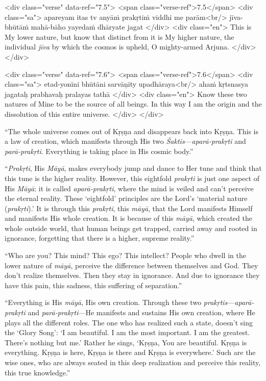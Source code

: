 \begin{html}
<div class="verse" data-ref="7.5">
  <span class="verse-ref">7.5</span>
  <div class="sa">
    apareyam itas tv anyāṁ prakṛtiṁ viddhi me parām<br/>
    jīva-bhūtāṁ mahā-bāho yayedaṁ dhāryate jagat
  </div>
  <div class="en">
    This is My lower nature, but know that distinct from it is My higher nature, the individual \textit{jīva} by which the cosmos is upheld, O mighty-armed Arjuna.
  </div>
</div>
\end{html}



\begin{html}
<div class="verse" data-ref="7.6">
  <span class="verse-ref">7.6</span>
  <div class="sa">
    etad-yonīni bhūtāni sarvāṇīty upadhāraya<br/>
    ahaṁ kṛtsnasya jagataḥ prabhavaḥ pralayas tathā
  </div>
  <div class="en">
    Know these two natures of Mine to be the source of all beings. In this way I am the origin and the dissolution of this entire universe.
  </div>
</div>
\end{html}


\enquote{The whole universe comes out of Kṛṣṇa and disappears back into Kṛṣṇa. This is a law of creation, which manifests through His two \textit{Śaktis}---\textit{aparā-prakṛti} and \textit{parā-prakṛti}. Everything is taking place in His cosmic body.}

\enquote{\textit{Prakṛti}, His \textit{Māyā}, makes everybody jump and dance to Her tune and think that this tune is the higher reality. However, this eightfold \textit{prakṛti} is just one aspect of His \textit{Māyā}: it is called \textit{aparā-prakṛti}, where the mind is veiled and can’t perceive the eternal reality. These \enquote{eightfold} principles are the Lord’s \enquote{material nature (\textit{prakṛti}).} It is through this \textit{prakṛti}, this \textit{māyā}, that the Lord manifests Himself and manifests His whole creation. It is because of this \textit{māyā}, which created the whole outside world, that human beings get trapped, carried away and rooted in ignorance, forgetting that there is a higher, supreme reality.}

\enquote{Who are you? This mind? This ego? This intellect? People who dwell in the lower nature of \textit{māyā}, perceive the difference between themselves and God. They don’t realize themselves. Then they stay in ignorance. And due to ignorance they have this pain, this sadness, this suffering of separation.}

\enquote{Everything is His \textit{māyā}, His own creation. Through these two \textit{prakṛtis}---\textit{aparā-prakṛti} and \textit{parā-prakṛti}---He manifests and sustains His own creation, where He plays all the different roles. The one who has realized such a state, doesn’t sing the \enquote{Glory Song}: \enquote{I am beautiful. I am the most important. I am the greatest. There’s nothing but me.} Rather he sings, \enquote{Kṛṣṇa, You are beautiful. Kṛṣṇa is everything. Kṛṣṇa is here, Kṛṣṇa is there and Kṛṣṇa is everywhere.} Such are the wise ones, who are always seated in this deep realization and perceive this reality, this true knowledge.}

